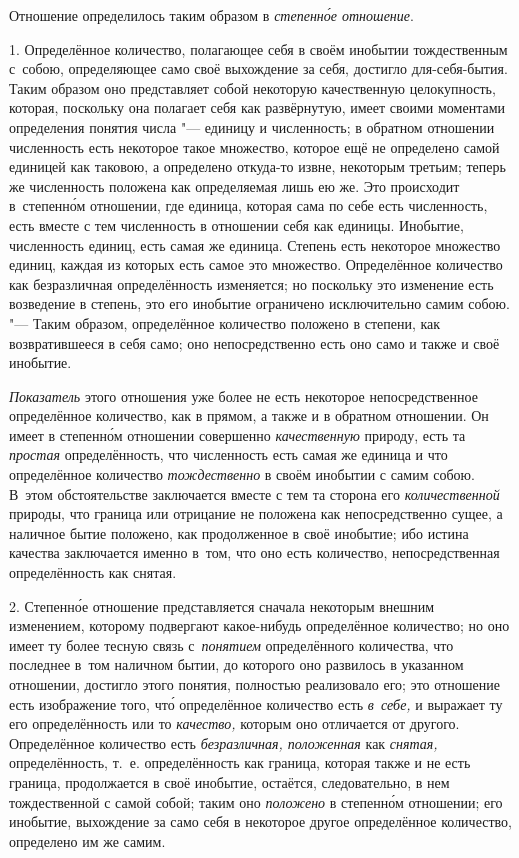 Отношение определилось таким образом в {\em степенн\'{о}е отношение}.


1. Определённое количество, полагающее себя в своём инобытии тождественным
с~собою, определяющее само своё выхождение за себя, достигло для-себя-бытия.
Таким образом оно представляет собой некоторую качественную целокупность,
которая, поскольку она полагает себя как развёрнутую, имеет своими моментами
определения понятия числа "--- единицу и численность; в обратном отношении
численность есть некоторое такое множество, которое ещё не определено самой
единицей как таковою, а определено откуда-то извне, некоторым третьим; теперь
же численность положена как определяемая лишь ею же. Это происходит
в~степенн\'{о}м отношении, где единица, которая сама по себе есть численность,
есть вместе с тем численность в отношении себя как единицы. Инобытие,
численность единиц, есть самая же единица. Степень есть некоторое множество
единиц, каждая из которых есть самое это множество. Определённое количество как
безразличная определённость изменяется; но поскольку это изменение есть
возведение в степень, это его инобытие ограничено исключительно самим собою.
"--- Таким образом, определённое количество положено в степени, как
возвратившееся в себя само; оно непосредственно есть оно само и также
и своё инобытие.

{\em Показатель} этого отношения уже более не есть некоторое непосредственное
определённое количество, как в прямом, а также и в обратном отношении. Он имеет
в степенн\'{о}м отношении совершенно {\em качественную} природу, есть та
{\em простая} определённость, что численность есть самая же единица и что
определённое количество {\em тождественно} в своём инобытии с самим собою.
В~этом обстоятельстве заключается вместе с тем та сторона его
{\em количественной} природы, что граница или отрицание не положена как
непосредственно сущее, а наличное бытие положено, как продолженное в своё
инобытие; ибо истина качества заключается именно в~том, что оно есть
количество, непосредственная определённость как снятая.

2. Степенн\'{о}е отношение представляется сначала некоторым внешним изменением,
которому подвергают какое-нибудь определённое количество; но оно имеет ту более
тесную связь с~{\em понятием} определённого количества, что последнее в~том
наличном бытии, до которого оно развилось в указанном отношении, достигло этого
понятия, полностью реализовало его; это отношение есть изображение того,
чт\'{о} определённое количество есть {\em в~себе,} и выражает ту его
определённость или то {\em качество,} которым оно отличается от другого.
Определённое количество есть {\em безразличная, положенная} как {\em снятая,}
определённость, т.~е. определённость как граница, которая также и не есть
граница, продолжается в своё инобытие, остаётся, следовательно, в нем
тождественной с самой собой; таким оно {\em положено} в степенн\'{о}м
отношении; его инобытие, выхождение за само себя в некоторое другое
определённое количество, определено им же самим.

